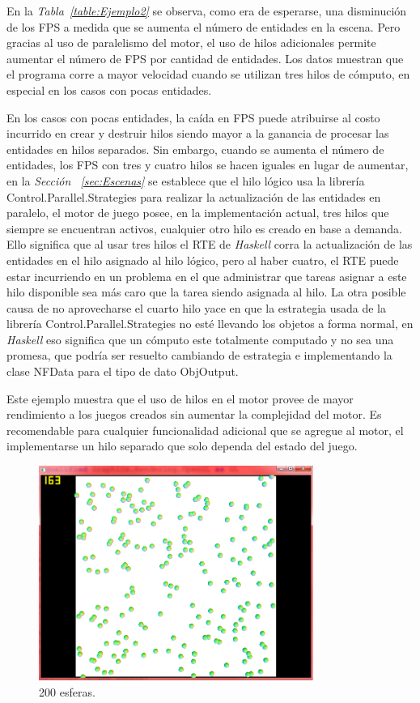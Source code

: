 En la \emph{Tabla~\ref{table:Ejemplo2}} se observa, como era de esperarse, una disminución de los FPS a medida que se aumenta el número de entidades en la escena. Pero gracias al uso de paralelismo del motor, el uso de hilos adicionales permite aumentar el número de FPS por cantidad de entidades. Los datos muestran que el programa corre a mayor velocidad cuando se utilizan tres hilos de cómputo, en especial en los casos con pocas entidades.

En los casos con pocas entidades, la caída en FPS puede atribuirse al costo incurrido en crear y destruir hilos siendo mayor a la ganancia de procesar las entidades en hilos separados. Sin embargo, cuando se aumenta el número de entidades, los FPS con tres y cuatro hilos se hacen iguales en lugar de aumentar, en la \emph{Sección ~\ref{sec:Escenas}} se establece que el hilo lógico usa la librería Control.Parallel.Strategies para realizar la actualización de las entidades en paralelo, el motor de juego posee, en la implementación actual, tres hilos que siempre se encuentran activos, cualquier otro hilo es creado en base a demanda. Ello significa que al usar tres hilos el RTE de \emph{Haskell} corra la actualización de las entidades en el hilo asignado al hilo lógico, pero al haber cuatro, el RTE puede estar incurriendo en un problema en el que administrar que tareas asignar a este hilo disponible sea más caro que la tarea siendo asignada al hilo. La otra posible causa de no aprovecharse el cuarto hilo yace en que la estrategia usada de la librería Control.Parallel.Strategies no esté llevando los objetos a forma normal, en \emph{Haskell} eso significa que un cómputo este totalmente computado y no sea una promesa, que podría ser resuelto cambiando de estrategia e implementando la clase NFData para el tipo de dato ObjOutput.

Este ejemplo muestra que el uso de hilos en el motor provee de mayor rendimiento a los juegos creados sin aumentar la complejidad del motor. Es recomendable para cualquier funcionalidad adicional que se agregue al motor, el implementarse un hilo separado que solo dependa del estado del juego.

\begin{figure}[!ht!]
\centering
\includegraphics[width=0.8\textwidth]{sceenshot2}
\caption[Ejemplo 3 - Escena del motor de juego]{200 esferas.}
\label{fig:Ejemplo_3}
\end{figure}


